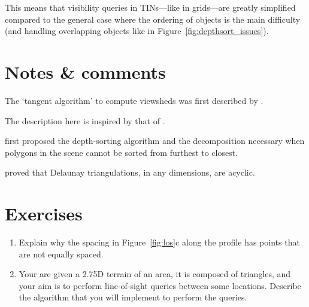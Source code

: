 %

This means that visibility queries in TINs---like in grids---are greatly simplified compared to the general case where the ordering of objects is the main difficulty (and handling overlapping objects like in Figure~\ref{fig:depthsort_issues}).



%
\section{Notes \& comments}

The `tangent algorithm' to compute viewsheds was first described by \citet{Blelloch90}.

The description here is inspired by that of \citet{DeFloriani99-1}.

\citet{Newell72} first proposed the depth-sorting algorithm and the decomposition necessary when polygons in the scene cannot be sorted from furthest to closest.

\citet{Edelsbrunner90} proved that Delaunay triangulations, in any dimensions, are acyclic.

%
\section{Exercises}

\begin{enumerate}
  \item Explain why the spacing in Figure~\ref{fig:los}c along the profile has points that are not equally spaced.
  \item Your are given a 2.75D terrain of an area, it is composed of triangles, and your aim is to perform line-of-sight queries between some locations. Describe the algorithm that you will implement to perform the queries.
\end{enumerate}
